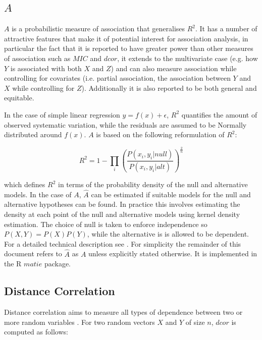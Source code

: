 \documentclass[a4paper, 12pt]{report}
\begin{document}

\subsection*{$A$}
$A$ is a probabilistic measure of association that generalises $R^2$. It has a number of attractive features that make it of potential interest for association analysis, in particular the fact that it is reported\cite{Murrel:2013:Online} to have greater power than other measures of association such as $MIC$ and $dcor$, it extends to the multivariate case (e.g. how $Y$ is associated with both $X$ and $Z$) and can also measure association while controlling for covariates (i.e. partial association, the association between $Y$ and $X$ while controlling for $Z$). Additionally it is also reported to be both general and equitable\cite{Murrel:2013:Online}.

In the case of simple linear regression $y = f(x) + \epsilon$, $R^2$ quantifies the amount of observed systematic variation, while the residuals are assumed to be Normally distributed around $f(x)$. $A$ is based on the following reformulation of $R^2$:

\[
R^2 = 1-\prod_i(\frac{P(x_i,y_i|null)}{P(x_i,y_i|alt)})^{\frac{2}{n}}
\]

which defines $R^2$ in terms of the probability density of the null and alternative models. In the case of $A$, $\hat{A}$ can be estimated if suitable models for the null and alternative hypotheses can be found. In practice this involves estimating the density at each point of the null and alternative models using kernel density estimation. The choice of null is taken to enforce independence so $P(X,Y)=P(X)P(Y)$, while the alternative is is allowed to be dependent. For a detailed technical description see \citet{Murrel:2013:Online}. For simplicity the remainder of this document refers to $\hat{A}$ as $A$ unless explicitly stated otherwise.  It is implemented in the R $matie$ \cite{matie} package.



\subsection*{Distance Correlation}
Distance correlation aims to measure all types of dependence between two or more random variables \cite{energy2013}. For two random vectors $X$ and $Y$ of size $n$, $dcor$ is computed as follows:
\end{document}
